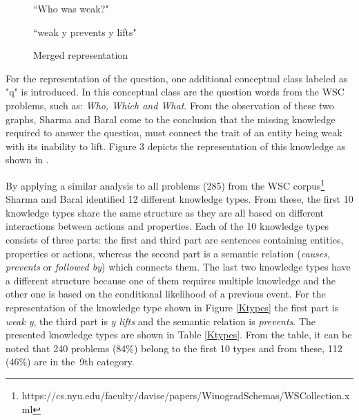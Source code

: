 \begin{figure} [h!]
	\centering
	
	\caption{\label{Graph12}``Who was weak?"}
\end{figure}

\begin{figure} [h!]
	\centering
	
	\caption{\label{Graph13} ``weak y prevents y lifts"}
\end{figure}

\begin{figure} [h!]
	\centering
	
	\caption{\label{Graph14} Merged representation}
\end{figure}

For the representation of the question, one additional conceptual class labeled as "q" is introduced. In this conceptual class are the question words from the WSC problems, such as: \textit{Who, Which and What}. 
From the observation of these two graphs, Sharma and Baral \cite{2018CommonsenseKT} come to the conclusion that the missing knowledge required to answer the question, must connect the trait of an entity being weak with its inability to lift. Figure 3 depicts the representation of this knowledge as shown in \cite{2018CommonsenseKT}. 

By applying a similar analysis to all problems (285) from the WSC corpus\footnote{https://cs.nyu.edu/faculty/davise/papers/WinogradSchemas/WSCollection.xml} Sharma and Baral \cite{2018CommonsenseKT} identified 12 different knowledge types. From these, the first 10 knowledge types share the same structure as they are all based on different interactions between actions and properties. Each of the 10 knowledge types consists of three parts: the first and third part are sentences containing entities, properties or actions, whereas the second part is a semantic relation (\textit{causes, prevents} or \textit{followed by}) which connects them. The last two knowledge types have a different structure because one of them requires multiple knowledge and the other one is based on the conditional likelihood of a previous event. 
For the representation of the knowledge type shown in Figure \ref{Ktypes} the first part is \textit{weak y}, the third part is \textit{y lifts} and the semantic relation is \textit{prevents}. The presented knowledge types are shown in Table \ref{Ktypes}. From the table, it can be noted that 240 problems (84\%) belong to the first 10 types and from these, 112 (46\%) are in the~9th category. \\ 

